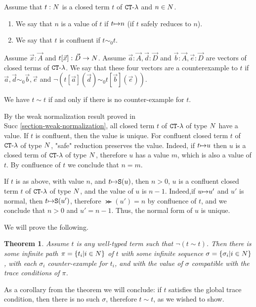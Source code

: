 \documentclass{article}
\newtheorem{theorem}{Theorem}[section]
\begin{document}
Assume that $t:{N}$ is a closed term $t$ of ${ {\tt CT} \mbox{-} \lambda}$ and $n \in {N}$. 
\begin{enumerate}
\item
We say that $n$ is a value of $t$ if $t {\mapsto} n$ (if $t$ safely reduces to $n$). 
\item
We say that $t$ is confluent if $t \sim_0 t$.
\end{enumerate}
Assume $\vec{x}:\vec{A}$ and $t[\vec{x}]: \vec{D} \rightarrow {N}$. Assume 
$\vec{a}:\vec{A},\vec{d}:\vec{D}$ 
and $\vec{b}:\vec{A},\vec{e}:\vec{D}$ are vectors of closed terms of ${ {\tt CT} \mbox{-} \lambda}$. We say that 
these four vectors are a counterexample to $t$ if $\vec{a},\vec{d} \sim_0 \vec{b},\vec{e}$
and $\neg (t[\vec{a}](\vec{d}) \sim_0  t[\vec{b}](\vec{e}))$.

We have $t \sim t$ if and only if there is no counter-example for $t$.


By the weak normalization result proved in \\Succ  \ref{section-weak-normalization}, all 
closed term $t$ of ${ {\tt CT} \mbox{-} \lambda}$ of type ${N}$ have a value. If $t$ is confluent, then the value is unique.
For confluent closed term $t$ of ${ {\tt CT} \mbox{-} \lambda}$ of type ${N}$, "safe" reduction preserves the value. Indeed,
if $t {\mapsto} u$ then $u$ is a closed term of ${ {\tt CT} \mbox{-} \lambda}$ of type ${N}$, therefore $u$ has a value
$m$, which is also a value of $t$. By confluence of $t$ we conclude that $n=m$.

If $t$ is as above, with value $n$, and $t {\mapsto} {\tt S} (u)$, then $n>0$, 
$u$ is a confluent closed term $t$ of ${ {\tt CT} \mbox{-} \lambda}$ of type ${N}$, and the value of $u$ is $n-1$.
Indeed,if $u {\mapsto} u'$ and $u'$ is normal, then $t {\mapsto} {\tt S} (u')$, therefore $\Succ (u')=n$ 
by confluence of $t$, and we conclude that $n>0$ and $u'=n-1$. Thus, the normal form of $u$ is unique.

We will prove the following.

\begin{theorem}
Assume $t$ is any well-typed term such that $\neg (t \sim t)$. Then there is some infinite path 
$\pi=\{t_i | i \in {N}\}$ of $t$ with some infinite sequence $\sigma= \{\sigma_i| i \in {N}\}$, with
each $\sigma_i$ counter-example for $t_i$, and with the value of $\sigma$ compatible with the
trace conditions of $\pi$.
\end{theorem}

As a corollary from the theorem we will conclude: 
if $t$ satisfies the global trace condition, then there is no such $\sigma$, therefore $t \sim t$, 
as we wished to show.
\end{document}
